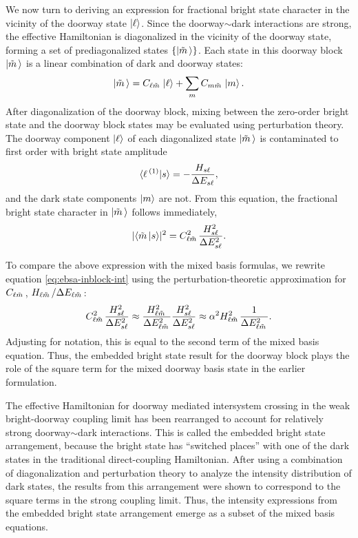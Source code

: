 We now turn to deriving an expression for fractional bright state
character in the vicinity of the doorway state $\mathinner{|{\ell}\rangle}$.  Since
the doorway$\sim$dark interactions are strong, the effective Hamiltonian is
diagonalized in the vicinity of the doorway state, forming a set of
prediagonalized states $\lbrace \mathinner{|{\tilde{m}\,}\rangle} \rbrace$.  Each state in
this doorway block $\mathinner{|{\tilde{m}\,}\rangle}$ is a linear combination of dark and
doorway states:
\begin{equation}
  \label{eq:ebsa-block}
  \mathinner{|{\tilde{m}\,}\rangle} = C_{\ell \tilde{m}\,} \mathinner{|{\ell}\rangle} + \sum_m C_{m \tilde{m}\,} \mathinner{|{m}\rangle}.
\end{equation}
After diagonalization of the doorway block, mixing between the
zero-order bright state and the doorway block states may be evaluated
using perturbation theory. The doorway component $\mathinner{|{\ell}\rangle}$ of each
diagonalized state $\mathinner{|{\tilde{m}\,}\rangle}$ is contaminated to first order with
bright state amplitude
\begin{equation}
  \label{eq:ebsa-inblock-overlap}
  \mathinner{\langle{\ell\,^{(1)}|s}\rangle} = - \frac{H_{s\ell}}{\Delta E_{s\ell}},
\end{equation}
and the dark state components $\mathinner{|{m}\rangle}$ are not. From this equation,
the fractional bright state character in $\mathinner{|{\tilde{m}\,}\rangle}$ follows
immediately,
\begin{equation}
  \label{eq:ebsa-inblock-int}
  \lvert \mathinner{\langle{\tilde{m}\,|s}\rangle} \rvert^2 =
  C_{\ell \tilde{m}\,}^2 \frac{H_{s\ell}^2}{\Delta E_{s\ell}^2}.
\end{equation}

To compare the above expression with the mixed basis formulas,
we rewrite equation \ref{eq:ebsa-inblock-int} using the
perturbation-theoretic approximation for $C_{\ell\tilde{m}\,}$, $H_{\ell\tilde{m}\,} /
\Delta E_{\ell\tilde{m}\,}$:
\begin{equation}
  \label{eq:ebsa-inblock-int-approx}
  C_{\ell \tilde{m}\,}^2 \frac{H_{s\ell}^2}{\Delta E_{s\ell}^2} \approx
  \frac{H_{\ell \tilde{m}\,}^2}{\Delta E_{\ell \tilde{m}\,}^2} 
  \frac{ H_{s\ell}^2}{ \Delta E_{s\ell}^2} \approx
  \alpha^2 H_{\ell \tilde{m}\,}^2 \frac{1}{\Delta E_{\ell \tilde{m}\,}^2}.
\end{equation}
Adjusting for notation, this is equal to the second term of the mixed
basis equation.  Thus, the embedded bright state result for the doorway
block plays the role of the square term for the mixed doorway basis
state in the earlier formulation.

The effective Hamiltonian for doorway mediated intersystem crossing in
the weak bright-doorway coupling limit has been rearranged to account
for relatively strong doorway$\sim$dark interactions. This is called the
embedded bright state arrangement, because the bright state has
``switched places'' with one of the dark states in the traditional
direct-coupling Hamiltonian. After using a combination of
diagonalization and perturbation theory to analyze the intensity
distribution of dark states, the results from this arrangement were
shown to correspond to the square terms in the strong coupling
limit. Thus, the intensity expressions from the embedded bright state
arrangement emerge as a subset of the mixed basis equations.

